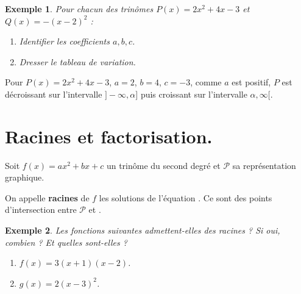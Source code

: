 \documentclass{beamer}
\newtheorem{exemple}{Exemple}
\begin{document}
 \begin{frame}
   
   \begin{exemple}
   Pour chacun des trinômes $P(x) = 2x^2+4x-3$ et $Q(x)=-(x-2)^2$ : 
    \begin{enumerate}
    \item Identifier les coefficients $a,b,c$.
    \item Dresser le tableau de variation.
    \end{enumerate}
   \end{exemple}
 \end{frame}

 \begin{frame}
 Pour $P(x) = 2x^2+4x-3$, $a=2$, $b=4$, $c=-3$, comme $a$ est positif,
  $P$ est décroissant sur l'intervalle $]-\infty,\alpha]$ puis croissant
  sur l'intervalle $\alpha,\infty[$.
  
 \end{frame}

 
 
 \section{Racines et factorisation.}
 
 \begin{frame}
 \begin{definition}
    Soit $f(x)=ax^2+bx+c$ un trinôme du second degré et $\mathcal{P}$ sa représentation 
    graphique.
    
    On appelle \textbf{racines} de $f$ les solutions de l'équation .
    Ce sont  des points d'intersection entre $\mathcal{P}$ 
    et .
    
  \end{definition}
\end{frame}
  
  \begin{frame}
  \begin{exemple}
    Les fonctions suivantes admettent-elles des racines ? Si oui, combien ? 
    Et quelles sont-elles ?
    \begin{enumerate}
     \item $f(x)=3(x+1)(x-2)$. 
     \item $g(x)=2(x-3)^2$.
    \end{enumerate}
  \end{exemple}
\end{frame}
  
\end{document}
